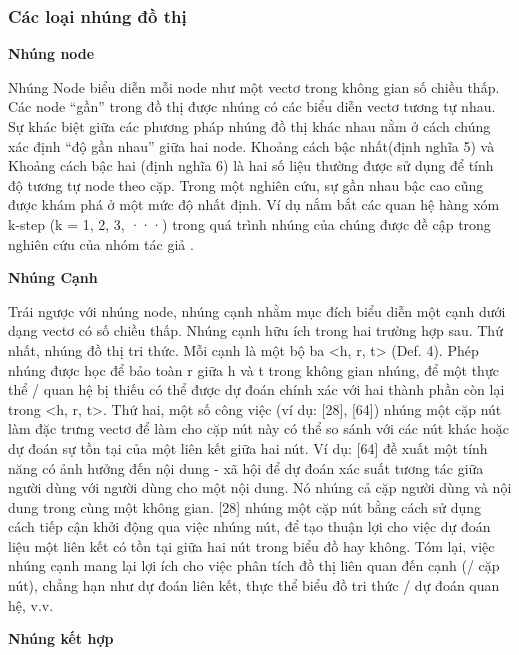\subsubsection{Các loại nhúng đồ thị}

\textbf{Nhúng node}

Nhúng Node biểu diễn mỗi node như một vectơ trong không gian số chiều thấp. Các node “gần” trong đồ thị được nhúng có các biểu diễn vectơ tương tự nhau. Sự khác biệt giữa các phương pháp nhúng đồ thị khác nhau nằm ở cách chúng xác định “độ gần nhau” giữa hai node. Khoảng cách bậc nhất(định nghĩa 5) và Khoảng cách bậc hai (định nghĩa 6) là hai số liệu thường được sử dụng để tính độ tương tự node theo cặp. Trong một nghiên cứu, sự gần nhau bậc cao cũng được khám phá ở một mức độ nhất định. Ví dụ nắm bắt các quan hệ hàng xóm k-step (k = 1, 2, 3, ···) trong quá trình nhúng của chúng được đề cập trong nghiên cứu của nhóm tác giả \cite{cao2015grarep}.

\textbf{Nhúng Cạnh}

Trái ngược với nhúng node, nhúng cạnh nhằm mục đích biểu diễn một cạnh dưới dạng vectơ có số chiều thấp. Nhúng cạnh hữu ích trong hai trường hợp sau. Thứ nhất, nhúng đồ thị tri thức. Mỗi cạnh là một bộ ba <h, r, t> (Def. 4). Phép nhúng được học để bảo toàn r giữa h và t trong không gian nhúng, để một thực thể / quan hệ bị thiếu có thể được dự đoán chính xác với hai thành phần còn lại trong <h, r, t>. Thứ hai, một số công việc (ví dụ: [28], [64]) nhúng một cặp nút làm đặc trưng vectơ để làm cho cặp nút này có thể so sánh với các nút khác hoặc dự đoán sự tồn tại của một liên kết giữa hai nút. Ví dụ: [64] đề xuất một tính năng có ảnh hưởng đến nội dung - xã hội để dự đoán xác suất tương tác giữa người dùng với người dùng cho một nội dung. Nó nhúng cả cặp người dùng và nội dung trong cùng một không gian. [28] nhúng một cặp nút bằng cách sử dụng cách tiếp cận khởi động qua việc nhúng nút, để tạo thuận lợi cho việc dự đoán liệu một liên kết có tồn tại giữa hai nút trong biểu đồ hay không. Tóm lại, việc nhúng cạnh mang lại lợi ích cho việc phân tích đồ thị liên quan đến cạnh (/ cặp nút), chẳng hạn như dự đoán liên kết, thực thể biểu đồ tri thức / dự đoán quan hệ, v.v.

\textbf{Nhúng kết hợp}


